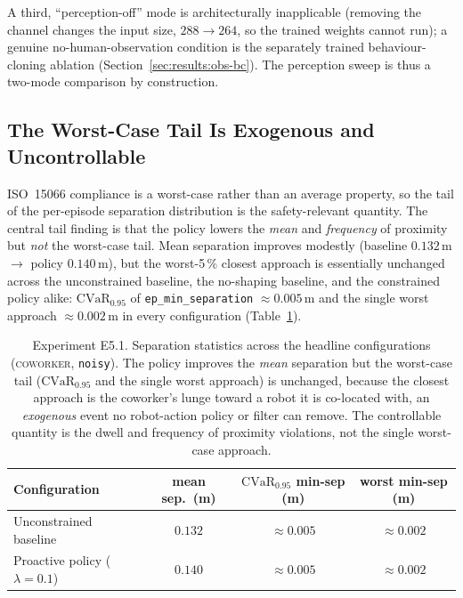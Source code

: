 \documentclass[11pt,a4paper]{report}
\newcommand{\iso}{ISO~15066}
\newcommand{\cvar}{\ensuremath{\mathrm{CVaR}}}
\newcommand{\coworker}{\textsc{coworker}}
\begin{document}
A third, ``perception-off'' mode is architecturally inapplicable
(removing the channel changes the input size, $288 \to 264$, so the
trained weights cannot run); a genuine no-human-observation
condition is the separately trained behaviour-cloning ablation
(Section~\ref{sec:results:obs-bc}). The perception sweep is thus a
two-mode comparison by construction.

\subsection{The Worst-Case Tail Is Exogenous and Uncontrollable}
\label{sec:results:tail}

\iso{} compliance is a worst-case rather than an average property, so
the tail of the per-episode separation distribution is the
safety-relevant quantity. The central tail finding is that the policy
lowers the \emph{mean} and \emph{frequency} of proximity but
\emph{not} the worst-case tail. Mean separation improves modestly
(baseline $0.132$\,m $\rightarrow$ policy $0.140$\,m), but the
worst-5\,\% closest approach is essentially unchanged across the
unconstrained baseline, the no-shaping baseline, and the constrained
policy alike: $\cvar_{0.95}$ of \texttt{ep\_min\_separation}
$\approx 0.005$\,m and the single worst approach
$\approx 0.002$\,m in every configuration
(Table~\ref{tab:e5.1-tail}).

\begin{table}[htbp]
\centering
\caption{Experiment E5.1. Separation statistics across the headline
configurations (\coworker{}, \texttt{noisy}). The policy improves the
\emph{mean} separation but the worst-case tail ($\cvar_{0.95}$ and the
single worst approach) is unchanged, because the closest approach is
the coworker's lunge toward a robot it is co-located with, an
\emph{exogenous} event no robot-action policy or filter can remove.
The controllable quantity is the dwell and frequency of proximity violations, not
the single worst-case approach.}
\label{tab:e5.1-tail}
\small
\begin{tabular}{lccc}
\toprule
Configuration & mean sep.\ (m) & $\cvar_{0.95}$ min-sep (m) & worst min-sep (m) \\
\midrule
Unconstrained baseline             & $0.132$ & $\approx 0.005$ & $\approx 0.002$ \\
Proactive policy ($\lambda{=}0.1$) & $0.140$ & $\approx 0.005$ & $\approx 0.002$ \\
\bottomrule
\end{tabular}
\end{table}
\end{document}
